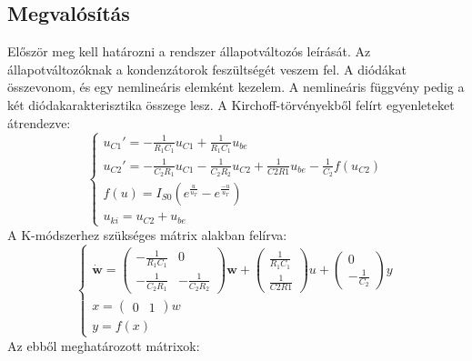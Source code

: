 \subsection{Megvalósítás}
Először meg kell határozni a rendszer állapotváltozós leírását. Az állapotváltozóknak a kondenzátorok 
feszültségét veszem fel. A diódákat összevonom, és egy nemlineáris elemként kezelem. A nemlineáris 
függvény pedig a két diódakarakterisztika összege lesz. A Kirchoff-törvényekből felírt egyenleteket 
átrendezve:
\begin{equation}
    \begin{cases}
        u_{C1}'=-\frac{1}{R_1C_1}u_{C1}+\frac{1}{R_1C_1}u_{be} \\
        u_{C2}'=-\frac{1}{C_2R_1}u_{C1}-\frac{1}{C_2R_2}u_{C2}+\frac{1}{C2R1}u_{be}-\frac{1}{C_2}f(u_{C2}) \\
        f(u)=I_{S0}(e^{\frac{u}{u_T}}-e^{\frac{-u}{u_T}}) \\
        u_{ki}=u_{C2}+u_{be}         
    \end{cases}
   \label{diodak}
\end{equation}
A K-módszerhez szükséges mátrix alakban felírva:
\begin{equation}
    \begin{cases}
        \mathbf{\dot{w}}=
    \begin{pmatrix}
        -\frac{1}{R_1C_1} & 0 \\
        -\frac{1}{C_2R_1} & -\frac{1}{C_2R_2}
    \end{pmatrix}
    \mathbf{w}+
    \begin{pmatrix}
        \frac{1}{R_1C_1} \\
        \frac{1}{C2R1}
    \end{pmatrix}
    u+
    \begin{pmatrix}
        0 \\
        -\frac{1}{C_2}
    \end{pmatrix}
    y \\
    x=
    \begin{pmatrix}
        0 & 1
    \end{pmatrix}
    w \\
    y=f(x)
    \end{cases}
\end{equation}
Az ebből meghatározott mátrixok:
